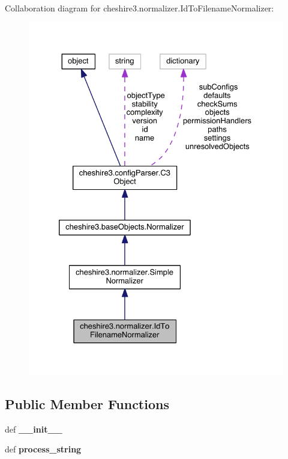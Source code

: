 Collaboration diagram for cheshire3.\-normalizer.\-Id\-To\-Filename\-Normalizer\-:
\nopagebreak
\begin{figure}[H]
\begin{center}
\leavevmode
\includegraphics[width=328pt]{classcheshire3_1_1normalizer_1_1_id_to_filename_normalizer__coll__graph}
\end{center}
\end{figure}
\subsection*{Public Member Functions}
\begin{DoxyCompactItemize}
\item 
\hypertarget{classcheshire3_1_1normalizer_1_1_id_to_filename_normalizer_af6bb5bfcf34646862642c92a8b8d23c9}{def {\bfseries \-\_\-\-\_\-init\-\_\-\-\_\-}}\label{classcheshire3_1_1normalizer_1_1_id_to_filename_normalizer_af6bb5bfcf34646862642c92a8b8d23c9}

\item 
\hypertarget{classcheshire3_1_1normalizer_1_1_id_to_filename_normalizer_a7ad9eed0618320fe3d79518d96add888}{def {\bfseries process\-\_\-string}}\label{classcheshire3_1_1normalizer_1_1_id_to_filename_normalizer_a7ad9eed0618320fe3d79518d96add888}

\end{DoxyCompactItemize}
